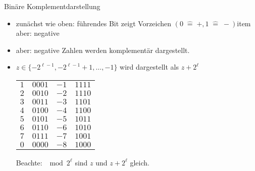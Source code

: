 \documentclass[a4paper,12pt]{article}
\theoremstyle{definition}
\newcommand{\corresponds}{\;\widehat{=}\;}
\begin{document}
	Binäre Komplementdarstellung
	\begin{itemize}
		\item zunächst wie oben: führendes Bit zeigt Vorzeichen $(0 \corresponds +, 1 \corresponds -)$item aber: negative 
		\item aber: negative Zahlen werden komplementär dargestellt.
		\item $z \in \{-2^{\ell - 1}, -2^{\ell - 1} + 1, \ldots, -1\}$ wird dargestellt als $z + 2^\ell$
		\begin{center}
			\begin{tabular}{l l l l}
				$1$ \hspace*{2ex} & $0001$ \hspace*{5ex} & $-1$ \hspace*{2ex} & $1111$\\
				$2$ & $0010$ & $-2$ & $1110$ \\
				$3$ & $0011$ & $-3$ & $1101$ \\
				$4$ & $0100$ & $-4$ & $1100$ \\
				$5$ & $0101$ & $-5$ & $1011$ \\
				$6$ & $0110$ & $-6$ & $1010$ \\
				$7$ & $0111$ & $-7$ & $1001$ \\
				$0$ & $0000$ & $-8$ & $1000$
			\end{tabular}
		\end{center}
		Beachte: $\mod 2^\ell$ sind $z$ und $z + 2^\ell$ gleich.
	\end{itemize}
\end{document}
